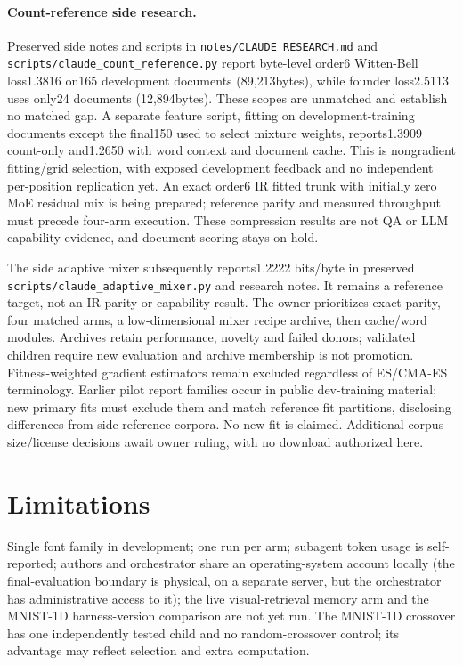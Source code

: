 \documentclass[11pt]{article}
\begin{document}
\paragraph{Count-reference side research.}
Preserved side notes and scripts in \texttt{notes/CLAUDE\_RESEARCH.md} and
\texttt{scripts/claude\_count\_reference.py} report byte-level order6 Witten-Bell
loss1.3816 on165 development documents (89{,}213bytes), while founder loss2.5113
uses only24 documents (12{,}894bytes). These scopes are unmatched and establish
no matched gap. A separate feature script, fitting on development-training
documents except the final150 used to select mixture weights, reports1.3909
count-only and1.2650 with word context and document cache. This is nongradient
fitting/grid selection, with exposed development feedback and no independent
per-position replication yet. An exact order6 IR fitted trunk with initially
zero MoE residual mix is being prepared; reference parity and measured throughput
must precede four-arm execution. These compression results are not QA or LLM
capability evidence, and document scoring stays on hold.

The side adaptive mixer subsequently reports1.2222 bits/byte in preserved
\texttt{scripts/claude\_adaptive\_mixer.py} and research notes. It remains a
reference target, not an IR parity or capability result. The owner prioritizes
exact parity, four matched arms, a low-dimensional mixer recipe archive, then
cache/word modules. Archives retain performance, novelty and failed donors;
validated children require new evaluation and archive membership is not promotion.
Fitness-weighted gradient estimators remain excluded regardless of ES/CMA-ES
terminology. Earlier pilot report families occur in public dev-training material;
new primary fits must exclude them and match reference fit partitions, disclosing
differences from side-reference corpora. No new fit is claimed. Additional corpus
size/license decisions await owner ruling, with no download authorized here.
\section{Limitations}
Single font family in development; one run per arm; subagent token usage is self-reported;
authors and orchestrator share an operating-system account locally (the final-evaluation
boundary is physical, on a separate server, but the orchestrator has administrative access to
it); the live visual-retrieval memory arm and the MNIST-1D harness-version comparison
are not yet run. The MNIST-1D crossover has one independently tested child and no
random-crossover control; its advantage may reflect selection and extra computation.
\end{document}
